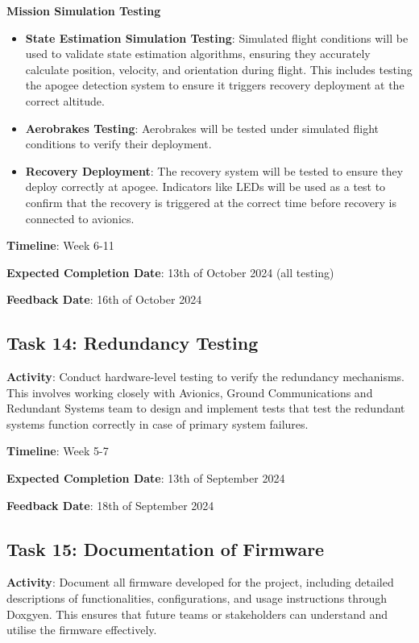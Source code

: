 \textbf{Mission Simulation Testing}
\begin{itemize}
    \item \textbf{State Estimation Simulation Testing}: Simulated flight conditions will be used to validate state estimation algorithms, ensuring they accurately calculate position, velocity, and orientation during flight. This includes testing the apogee detection system to ensure it triggers recovery deployment at the correct altitude.
    \item \textbf{Aerobrakes Testing}: Aerobrakes will be tested under simulated flight conditions to verify their deployment. 
    \item \textbf{Recovery Deployment}: The recovery system will be tested to ensure they deploy correctly at apogee. Indicators like LEDs will be used as a test to confirm that the recovery is triggered at the correct time before recovery is connected to avionics. 
\end{itemize}

\textbf{Timeline}: Week 6-11

\textbf{Expected Completion Date}: 13th of October 2024 (all testing)

\textbf{Feedback Date}: 16th of October 2024

\subsection{Task 14: Redundancy Testing}
\textbf{Activity}: Conduct hardware-level testing to verify the redundancy mechanisms. This involves working closely with Avionics, Ground Communications and Redundant Systems team to design and implement tests that test the redundant systems function correctly in case of primary system failures. 

\textbf{Timeline}: Week 5-7

\textbf{Expected Completion Date}: 13th of September 2024

\textbf{Feedback Date}: 18th of September 2024

\subsection{Task 15: Documentation of Firmware}
\textbf{Activity}: Document all firmware developed for the project, including detailed descriptions of functionalities, configurations, and usage instructions through Doxgyen. This ensures that future teams or stakeholders can understand and utilise the firmware effectively. 

